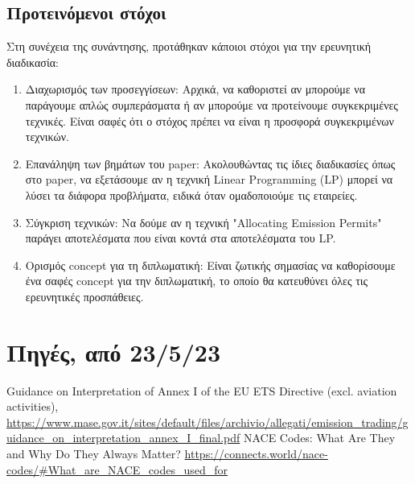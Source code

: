 \documentclass[a4paper,twoside,10pt]{article}
\begin{document}
\subsection{Προτεινόμενοι στόχοι}
Στη συνέχεια της συνάντησης, προτάθηκαν κάποιοι στόχοι για την ερευνητική διαδικασία:

\begin{enumerate}
	\item Διαχωρισμός των προσεγγίσεων: Αρχικά, να καθοριστεί αν μπορούμε να παράγουμε απλώς συμπεράσματα ή αν μπορούμε να προτείνουμε συγκεκριμένες τεχνικές. Είναι σαφές ότι ο στόχος πρέπει να είναι η προσφορά συγκεκριμένων τεχνικών.
	\item Επανάληψη των βημάτων του paper: Ακολουθώντας τις ίδιες διαδικασίες όπως στο paper, να εξετάσουμε αν η τεχνική Linear Programming (LP) μπορεί να λύσει τα διάφορα προβλήματα, ειδικά όταν ομαδοποιούμε τις εταιρείες.
	\item Σύγκριση τεχνικών: Να δούμε αν η τεχνική "Allocating Emission Permits" παράγει αποτελέσματα που είναι κοντά στα αποτελέσματα του LP.
	\item Ορισμός concept για τη διπλωματική: Είναι ζωτικής σημασίας να καθορίσουμε ένα σαφές concept για την διπλωματική, το οποίο θα κατευθύνει όλες τις ερευνητικές προσπάθειες.
\end{enumerate}

















\section{Πηγές, από 23/5/23}
\begin{thebibliography}{999}
	
	Guidance on Interpretation of Annex I of the EU ETS Directive (excl. aviation activities),
	\url{https://www.mase.gov.it/sites/default/files/archivio/allegati/emission_trading/guidance_on_interpretation_annex_I_final.pdf}
	NACE Codes: What Are They and Why Do They Always Matter?
	\url{https://connects.world/nace-codes/#What_are_NACE_codes_used_for}
	
\end{thebibliography}
\end{document}

